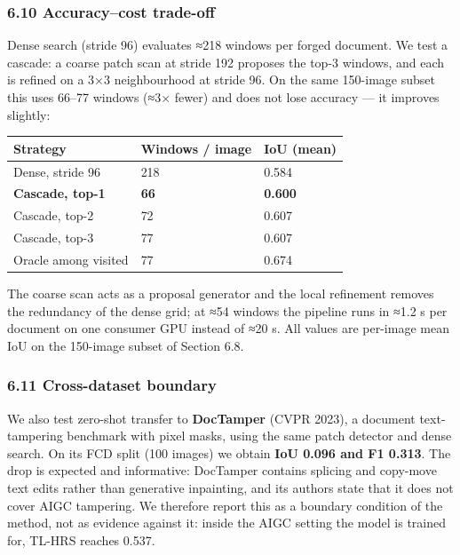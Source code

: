 \subsubsection{6.10 Accuracy--cost trade-off}\label{accuracycost-trade-off}

Dense search (stride 96) evaluates ≈218 windows per forged document. We test a cascade: a coarse patch scan at stride 192 proposes the top-3 windows, and each is refined on a 3×3 neighbourhood at stride 96. On the same 150-image subset this uses 66--77 windows (≈3× fewer) and does not lose accuracy --- it improves slightly:

{\def\LTcaptype{none} %
\begin{longtable}[]{@{}lll@{}}
\toprule\noalign{}
Strategy & Windows / image & IoU (mean) \\
\midrule\noalign{}
\endhead
\bottomrule\noalign{}
\endlastfoot
Dense, stride 96 & 218 & 0.584 \\
\textbf{Cascade, top-1} & \textbf{66} & \textbf{0.600} \\
Cascade, top-2 & 72 & 0.607 \\
Cascade, top-3 & 77 & 0.607 \\
Oracle among visited & 77 & 0.674 \\
\end{longtable}
}

The coarse scan acts as a proposal generator and the local refinement removes the redundancy of the dense grid; at ≈54 windows the pipeline runs in ≈1.2 s per document on one consumer GPU instead of ≈20 s. All values are per-image mean IoU on the 150-image subset of Section 6.8.

\subsubsection{6.11 Cross-dataset boundary}\label{cross-dataset-boundary}

We also test zero-shot transfer to \textbf{DocTamper} (CVPR 2023), a document text-tampering benchmark with pixel masks, using the same patch detector and dense search. On its FCD split (100 images) we obtain \textbf{IoU 0.096 and F1 0.313}. The drop is expected and informative: DocTamper contains splicing and copy-move text edits rather than generative inpainting, and its authors state that it does not cover AIGC tampering. We therefore report this as a boundary condition of the method, not as evidence against it: inside the AIGC setting the model is trained for, TL-HRS reaches 0.537.

